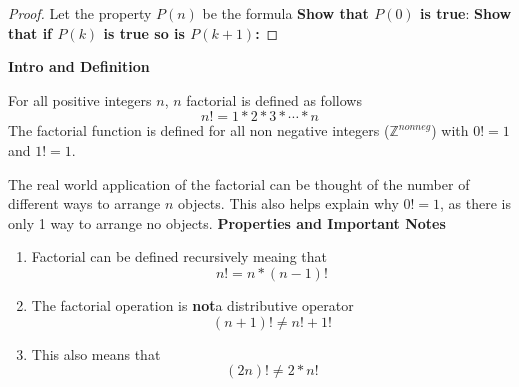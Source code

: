 \documentclass[addpoints]{exam}
\begin{document}
\else
	\begin{proof}
		Let the property $P(n)$ be the formula
		\vspace{0.5in}
		\newline \textbf{Show that $P(0)$ is true}:
		\vspace{1.5in}
		\newline \textbf{Show that if $P(k)$ is true so is $P(k+1)$:}
		\vspace{2in}
		\newline
	\end{proof}
\fi
\newpage
\begin{tcolorbox}[breakable, title=FACTORIAL REVIEW, colframe=black, sharp corners, colback=white, colbacktitle=white, coltitle=black]
	\Large\textbf{Intro and Definition}
	\normalsize
	\begin{tcolorbox}[breakable, title=DEFINITION, colframe=black, sharp corners, colback=white, colbacktitle=white, coltitle=black]
		For all positive integers $n$, $n$ factorial is defined as follows
		\[
			n\textbf{!} = 1 * 2 * 3 * \cdots * n
		\]
		The factorial function is defined for all non negative integers ($\mathbb{Z}^{nonneg}$) with $0\textbf{!} = 1$ and $1\textbf{!} = 1$.
	\end{tcolorbox}
	The real world application of the factorial can be thought of the number of different ways to arrange $n$ objects. This also helps explain why $0\textbf{!} = 1$, as there is only 1 way to arrange no objects.
	\vspace{0.1in}
	\noindent\makebox[\linewidth]{\hrulefill}
	\newline
	\Large\textbf{Properties and Important Notes}
	\normalsize
	\begin{tcolorbox}[breakable, title=PROPERTIES, colframe=black, sharp corners, colback=white, colbacktitle=white, coltitle=black]
		\begin{enumerate}
			\item Factorial can be defined recursively meaing that
			      \[
				      n\textbf{!} = n * \left(n-1\right)\textbf{!}
			      \]
			\item The factorial operation is \textbf{not}a distributive operator
			      \[
				      (n+1)\textbf{!} \ne n\textbf{!} + 1\textbf{!}
			      \]
			\item This also means that
			      \[
				      \left(2n\right)\textbf{!} \ne 2 * n\textbf{!}
			      \]
		\end{enumerate}
	\end{tcolorbox}
\end{tcolorbox}
\end{document}

